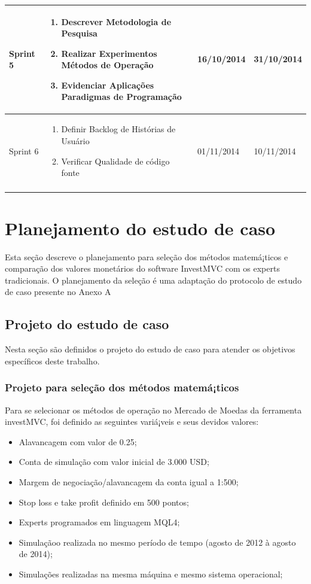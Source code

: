 \begin{center}
\begin{longtable}{  | p{2cm} | p{8cm} | p{2cm}| p{2cm} |}
    Sprint 5 & \begin{enumerate}
    \item Descrever Metodologia de Pesquisa
    \item Realizar Experimentos Métodos de Operação
    \item Evidenciar Aplicações Paradigmas de Programação
    \end{enumerate} & 16/10/2014 & 31/10/2014\\ \hline
    
    Sprint 6 & \begin{enumerate}
    \item Definir Backlog de Histórias de Usuário
    \item Verificar Qualidade de código fonte
    \end{enumerate} & 01/11/2014 & 10/11/2014\\
\label{cronograma}
\end{longtable}
\end{center}

\section{Planejamento do estudo de caso}

Esta seção descreve o planejamento para seleção dos métodos matemá¡ticos e comparação dos valores monetários do software InvestMVC com os experts tradicionais. O planejamento da seleção é uma adaptação do protocolo de estudo de caso presente no Anexo A \cite{brereton}

\subsection{Projeto do estudo de caso}

Nesta seção são definidos o projeto do estudo de caso para atender os objetivos específicos deste trabalho.

\subsubsection{Projeto para seleção dos métodos matemá¡ticos}

Para se selecionar os métodos de operação no Mercado de Moedas da ferramenta investMVC, foi definido as seguintes variá¡veis e seus devidos valores:

\begin{itemize}
\item Alavancagem com valor de 0.25;
\item Conta de simulação com valor inicial de 3.000 USD;
\item Margem de negociação/alavancagem da conta igual a 1:500;
\item Stop loss e take profit definido em 500 pontos;
\item Experts programados em linguagem MQL4;
\item Simulaçãoo realizada no mesmo período de tempo (agosto de 2012 à  agosto de 2014);
\item Simulações realizadas na mesma máquina e mesmo sistema operacional;
\end{itemize}


